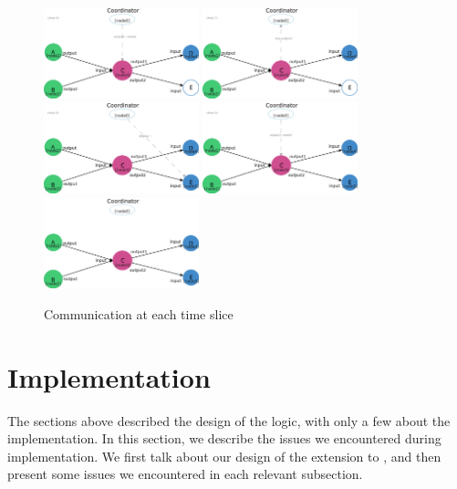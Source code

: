 \begin{figure}[h]
    \includegraphics[width=0.4\textwidth]{figures/incdep_example_7}
    \includegraphics[width=0.4\textwidth]{figures/incdep_example_8}
    \includegraphics[width=0.4\textwidth]{figures/incdep_example_9}
    \includegraphics[width=0.4\textwidth]{figures/incdep_example_10}
    \includegraphics[width=0.4\textwidth]{figures/incdep_example_all}
	\caption{Communication at each time slice}	\label{fig:incdep_example_steps}
\end{figure}

\section{Implementation}
The sections above described the design of the logic, with only a few about the implementation. In this section, we describe the issues we encountered during implementation. We first talk about our design of the extension to \dpy, and then present some issues we encountered in each relevant subsection.

